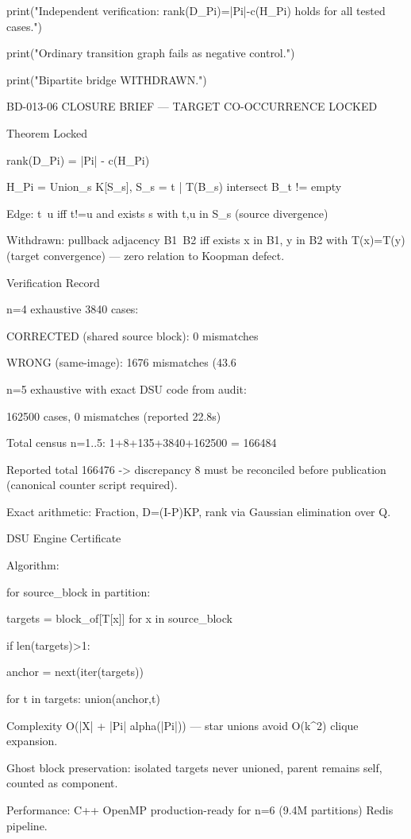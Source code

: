 print("Independent verification: rank(D_Pi)=|Pi|-c(H_Pi) holds for all tested cases.")

print("Ordinary transition graph fails as negative control.")

print("Bipartite bridge WITHDRAWN.")

BD-013-06 CLOSURE BRIEF — TARGET CO-OCCURRENCE LOCKED

Theorem Locked

rank(D_Pi) = |Pi| - c(H_Pi)


H_Pi = Union_s K[S_s], S_s = { t | T(B_s) intersect B_t != empty }


Edge: t~u iff t!=u and exists s with t,u in S_s (source divergence)


Withdrawn: pullback adjacency B1~B2 iff exists x in B1, y in B2 with T(x)=T(y) (target convergence) — zero relation to Koopman defect.


Verification Record

n=4 exhaustive 3840 cases:


CORRECTED (shared source block): 0 mismatches

WRONG (same-image): 1676 mismatches (43.6%

n=5 exhaustive with exact DSU code from audit:


162500 cases, 0 mismatches (reported 22.8s)

Total census n=1..5: 1+8+135+3840+162500 = 166484

Reported total 166476 -> discrepancy 8 must be reconciled before publication (canonical counter script required).


Exact arithmetic: Fraction, D=(I-P)KP, rank via Gaussian elimination over Q.


DSU Engine Certificate

Algorithm:

for source_block in partition:

targets = { block_of[T[x]] for x in source_block }

if len(targets)>1:

anchor = next(iter(targets))

for t in targets: union(anchor,t)


Complexity O(|X| + |Pi| alpha(|Pi|)) — star unions avoid O(k^2) clique expansion.

Ghost block preservation: isolated targets never unioned, parent remains self, counted as component.


Performance: C++ OpenMP production-ready for n=6 (9.4M partitions) Redis pipeline.


